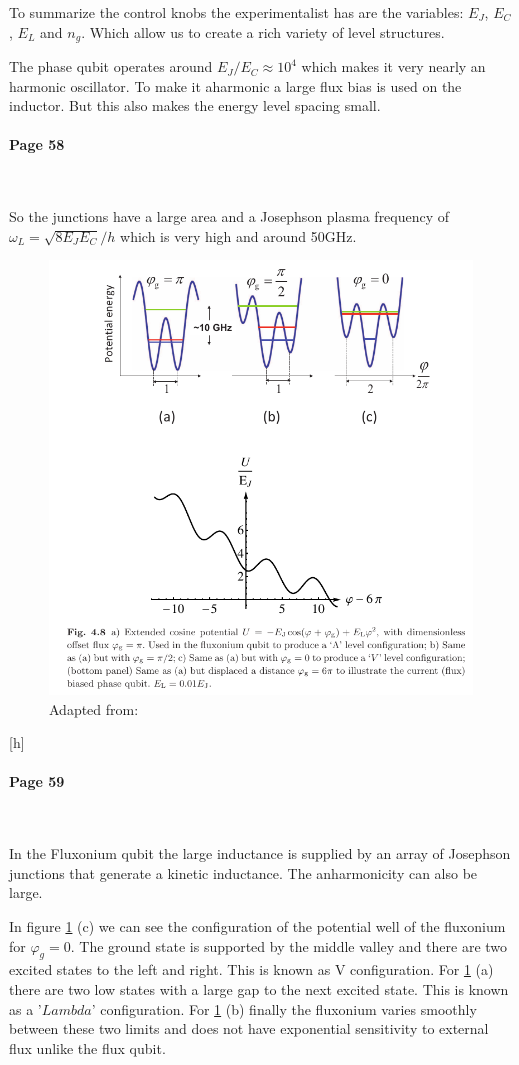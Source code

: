 \documentclass[12pt]{article}
\numberwithin{equation}{subsection}
\newcommand\page[1]{
{
\color{blue}\paragraph{
Page #1
}\mbox{}\\
}
}
\begin{document}
To summarize the control knobs the experimentalist has are the variables: $E_J$, $E_C$, $E_L$ and $n_g$. Which allow us to create a rich variety of level structures.

The phase qubit operates around $E_J/E_C \approx 10^4$ which makes it very nearly an harmonic oscillator. 
To make it aharmonic a large flux bias is used on the inductor. But this also makes the energy level spacing small. 
\page{58}
So the junctions have a large area and a Josephson plasma frequency of $\omega_L = \sqrt {8E_JE_C}/h $ which is very high and around 50GHz.

\begin{figure}[h]
\includegraphics[scale=0.5]{images/58-fluxonium-wells.png}
\caption{Adapted from: \cite{Girvin2015CircuitQS}}
\label{58-fluxonium-wells}
\end{figure}[h]

\page{59}
In the Fluxonium qubit the large inductance is supplied by an array of Josephson junctions that generate a kinetic inductance. The anharmonicity can also be large.


In figure \ref{58-fluxonium-wells} (c) we can see the configuration of the potential well of the fluxonium for $\varphi_g = 0$. The ground state is supported by the middle valley and there are two excited states to the left and right. This is known as V configuration.
For \ref{58-fluxonium-wells} (a) there are two low states with a large gap to the next excited state. This is known as a '$Lambda$' configuration.
For \ref{58-fluxonium-wells} (b) finally the fluxonium varies smoothly between these two limits and does not have exponential sensitivity to external flux unlike the flux qubit.
\end{document}
